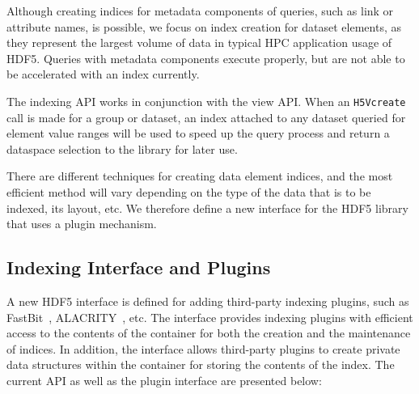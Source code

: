 \documentclass[letterpaper,hyper]{THG_RFC}
\begin{document}
Although creating indices for metadata components of queries, such as link or
attribute names, is possible, we focus on index creation for dataset elements,
as they represent the largest volume of data in typical HPC application usage of
HDF5. Queries with metadata components execute properly,
 but are not able to be accelerated
with an index currently.

The indexing API works in conjunction with the view API. When an \texttt{H5Vcreate}
call is made for a group or dataset, an index attached to any dataset queried
for element value ranges will be used to speed up the query process and return
a dataspace selection to the library for later use.

There are different techniques for creating data element indices, and the most
efficient method will vary depending on the type of the data that is to be
indexed, its layout, etc. We therefore define a new interface for the HDF5
library that uses a plugin mechanism.

\subsection{Indexing Interface and Plugins}

A new HDF5 interface is defined for adding third-party indexing plugins,
such as FastBit~\cite{Wu05}, ALACRITY~\cite{alacrity13}, etc.
The interface provides indexing plugins with efficient access to the contents of
the container for both the creation and the maintenance of indices. In addition,
the interface allows third-party plugins to create private data structures
within the container for storing the contents of the index.
The current API as well as the plugin interface are presented below:
\end{document}
